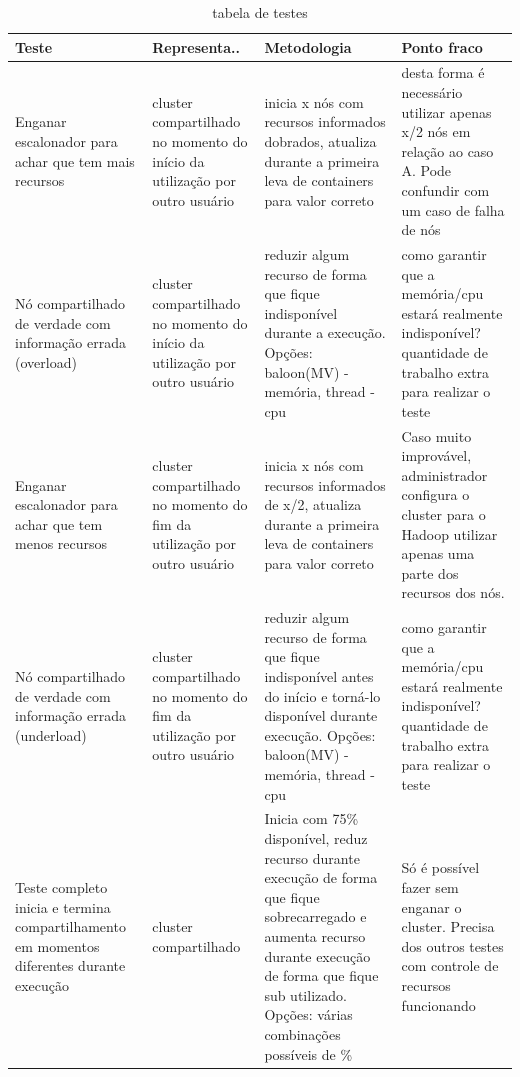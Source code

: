 \begin{table}[!h]
	\centering
	\begin{tabular}{|p{2.5cm}|p{3.5cm}|p{4.5cm}|p{4.0cm}|}
		\hline
		Teste & Representa.. & Metodologia & Ponto fraco\\
		\hline
		Enganar escalonador para achar que tem mais recursos & cluster compartilhado no momento do início da utilização por outro usuário & inicia x nós com recursos informados dobrados, atualiza durante a primeira leva de containers para valor correto & desta forma é necessário utilizar apenas x/2 nós em relação ao caso A. Pode confundir com um caso de falha de nós\\
		\hline
		Nó compartilhado de verdade com informação errada (overload)& cluster compartilhado no momento do início da utilização por outro usuário & reduzir algum recurso de forma que fique indisponível durante a execução. Opções: baloon(MV) - memória, thread - cpu & como garantir que a memória/cpu estará realmente indisponível? quantidade de trabalho extra para realizar o teste\\
		\hline
		Enganar escalonador para achar que tem menos recursos & cluster compartilhado no momento do fim da utilização por outro usuário & inicia x nós com recursos informados de x/2, atualiza durante a primeira leva de containers para valor correto & Caso muito improvável, administrador configura o cluster para o Hadoop utilizar apenas uma parte dos recursos dos nós.\\
		\hline
		Nó compartilhado de verdade com informação errada (underload)& cluster compartilhado no momento do fim da utilização por outro usuário & reduzir algum recurso de forma que fique indisponível antes do início e torná-lo disponível durante execução. Opções: baloon(MV) - memória, thread - cpu & como garantir que a memória/cpu estará realmente indisponível? quantidade de trabalho extra para realizar o teste\\
		\hline
		Teste completo inicia e termina compartilhamento em momentos diferentes durante execução & cluster compartilhado & Inicia com 75\% disponível, reduz recurso durante execução de forma que fique sobrecarregado e aumenta recurso durante execução de forma que fique sub utilizado. Opções: {várias combinações} possíveis de \% & Só é possível fazer sem enganar o cluster. Precisa dos outros testes com controle de recursos funcionando\\
		\hline
	\end{tabular}
	\caption{tabela de testes}
	\label{tab:memory allocation2}
\end{table}
